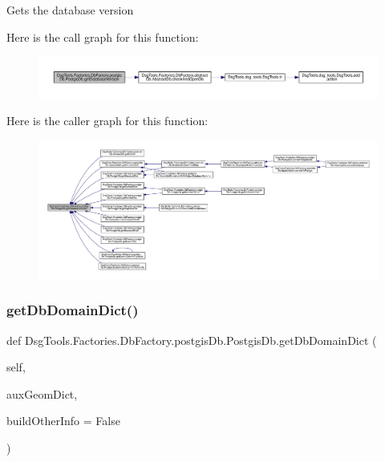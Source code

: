 \begin{DoxyVerb}Gets the database version
\end{DoxyVerb}
 Here is the call graph for this function\+:
\nopagebreak
\begin{figure}[H]
\begin{center}
\leavevmode
\includegraphics[width=350pt]{class_dsg_tools_1_1_factories_1_1_db_factory_1_1postgis_db_1_1_postgis_db_af7605f4bd100927ce43472e864764774_cgraph}
\end{center}
\end{figure}
Here is the caller graph for this function\+:
\nopagebreak
\begin{figure}[H]
\begin{center}
\leavevmode
\includegraphics[width=350pt]{class_dsg_tools_1_1_factories_1_1_db_factory_1_1postgis_db_1_1_postgis_db_af7605f4bd100927ce43472e864764774_icgraph}
\end{center}
\end{figure}
\mbox{\label{class_dsg_tools_1_1_factories_1_1_db_factory_1_1postgis_db_1_1_postgis_db_a7aadf24584f50de40fc86a9ee04aa140}} 
\subsubsection{\texorpdfstring{get\+Db\+Domain\+Dict()}{getDbDomainDict()}}
{\footnotesize\ttfamily def Dsg\+Tools.\+Factories.\+Db\+Factory.\+postgis\+Db.\+Postgis\+Db.\+get\+Db\+Domain\+Dict (\begin{DoxyParamCaption}\item[{}]{self,  }\item[{}]{aux\+Geom\+Dict,  }\item[{}]{build\+Other\+Info = {\ttfamily False} }\end{DoxyParamCaption})}

